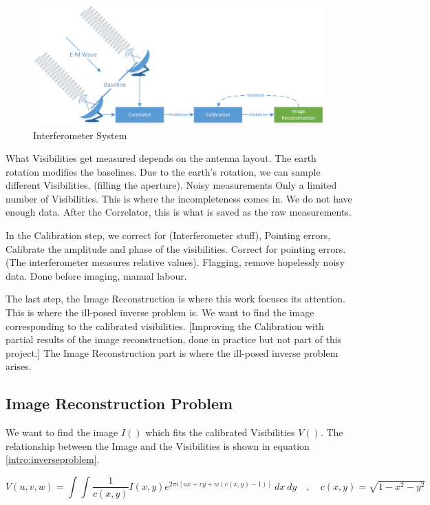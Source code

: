 \begin{figure}[h]
	\centering
	\includegraphics[width=0.80\linewidth]{./chapters/01.intro/system.png}
	\caption{Interferometer System}
	\label{intro:system}
\end{figure}

What Visibilities get measured depends on the antenna layout. The earth rotation modifies the baselines. Due to the earth's rotation, we can sample different Visibilities. (filling the aperture).
Noisy measurements
Only a limited number of Visibilities. This is where the incompleteness comes in. We do not have enough data.
After the Correlator, this is what is saved as the raw measurements.

In the Calibration step, we correct for (Interferometer stuff), Pointing errors, Calibrate the amplitude and phase of the visibilities. Correct for pointing errors. (The interferometer measures relative values). Flagging, remove hopelessly noisy data.
Done before imaging, manual labour.

The last step, the Image Reconstruction is where this work focuses its attention. This is where the ill-posed inverse problem is. We want to find the image corresponding to the calibrated visibilities. 
[Improving the Calibration with partial results of the image reconstruction, done in practice but not part of this project.]
The Image Reconstruction part is where the ill-posed inverse problem arises.


\subsection{Image Reconstruction Problem}
We want to find the image $I()$ which fits the calibrated Visibilities $V()$. The relationship between the Image and the Visibilities is shown in equation \eqref{intro:inverseproblem}.

\begin{equation}\label{intro:inverseproblem}
V(u, v, w) = \int\int \frac{1}{c(x, y)} I(x, y) e^{2 \pi i [ux+vy+ w(c(x, y) - 1)]} \: dx \: dy \quad, \quad c(x,y) = \sqrt{1 - x^2 - y ^2}
\end{equation}

